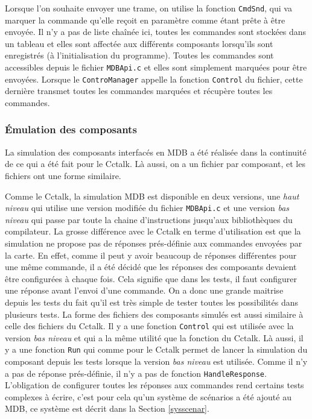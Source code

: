 \documentclass[a4paper]{article}
\begin{document}
Lorsque l'on souhaite envoyer une trame, on utilise la fonction \verb|CmdSnd|,
qui va marquer la commande qu'elle reçoit en paramètre comme étant prête à être
envoyée. Il n'y a pas de liste chaînée ici, toutes les commandes sont stockées
dans un tableau et elles sont affectée aux différents composants lorsqu'ils sont
enregistrés (à l'initialisation du programme). Toutes les commandes sont
accessibles depuis le fichier \verb|MDBApi.c| et elles sont simplement marquées
pour être envoyées. Lorsque le \verb|ControManager| appelle la fonction
\verb|Control| du fichier, cette dernière transmet toutes les commandes marquées
et récupère toutes les commandes.

\subsubsection{Émulation des composants}

La simulation des composants interfacés en MDB a été réalisée dans la continuité
de ce qui a été fait pour le Cctalk. Là aussi, on a un fichier par composant, et
les fichiers ont une forme similaire.

Comme le Cctalk, la simulation MDB est disponible en deux versions, une
\textit{haut niveau} qui utilise une version modifiée du fichier \verb|MDBApi.c|
et une version \textit{bas niveau} qui passe par toute la chaine d'instructions
jusqu'aux bibliothèques du compilateur. La grosse différence avec le Cctalk en
terme d'utilisation est que la simulation ne propose pas de réponses
prés-définie aux commandes envoyées par la carte. En effet, comme il peut y
avoir beaucoup de réponses différentes pour une même commande, il a été décidé
que les réponses des composants devaient être configurées à chaque fois. Cela
signifie que dans les tests, il faut configurer une réponse avant l'envoi d'une
commande. On a donc une grande maitrise depuis les tests du fait qu'il est très
simple de tester toutes les possibilités dans plusieurs tests. La forme des
fichiers des composants simulés est aussi similaire à celle des fichiers du
Cctalk. Il y a une fonction \verb|Control| qui est utilisée avec la version
\textit{bas niveau} et qui a la même utilité que la fonction du Cctalk. Là
aussi, il y a une fonction \verb|Run| qui comme pour le Cctalk permet de lancer
la simulation du composant depuis les tests lorsque la version \textit{bas
niveau} est utilisée. Comme il n'y a pas de réponse prés-définie, il n'y a pas
de fonction \verb|HandleResponse|. L'obligation de configurer toutes les
réponses aux commandes rend certains tests complexes à écrire, c'est pour cela
qu'un système de scénarios a été ajouté au MDB, ce système est décrit dans la
Section \ref{sysscenar}.
\end{document}
